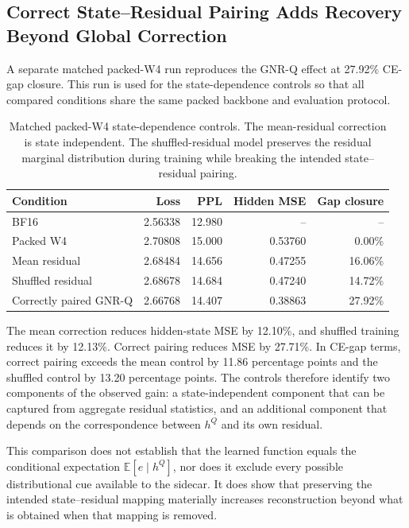 \documentclass[11pt]{article}
\begin{document}
\subsection{Correct State--Residual Pairing Adds Recovery Beyond Global Correction}

A separate matched packed-W4 run reproduces the GNR-Q effect at 27.92\% CE-gap closure. This run is used for the state-dependence controls so that all compared conditions share the same packed backbone and evaluation protocol.

\begin{table}[t]
\centering
\small
\begin{tabular}{lrrrr}
\toprule
Condition & Loss & PPL & Hidden MSE & Gap closure \\
\midrule
BF16 & 2.56338 & 12.980 & -- & -- \\
Packed W4 & 2.70808 & 15.000 & 0.53760 & 0.00\% \\
Mean residual & 2.68484 & 14.656 & 0.47255 & 16.06\% \\
Shuffled residual & 2.68678 & 14.684 & 0.47240 & 14.72\% \\
Correctly paired GNR-Q & 2.66768 & 14.407 & 0.38863 & 27.92\% \\
\bottomrule
\end{tabular}
\caption{Matched packed-W4 state-dependence controls. The mean-residual correction is state independent. The shuffled-residual model preserves the residual marginal distribution during training while breaking the intended state--residual pairing.}
\label{tab:statecontrols}
\end{table}

The mean correction reduces hidden-state MSE by 12.10\%, and shuffled training reduces it by 12.13\%. Correct pairing reduces MSE by 27.71\%. In CE-gap terms, correct pairing exceeds the mean control by 11.86 percentage points and the shuffled control by 13.20 percentage points. The controls therefore identify two components of the observed gain: a state-independent component that can be captured from aggregate residual statistics, and an additional component that depends on the correspondence between $h^Q$ and its own residual.

This comparison does not establish that the learned function equals the conditional expectation $\mathbb{E}[e\mid h^Q]$, nor does it exclude every possible distributional cue available to the sidecar. It does show that preserving the intended state--residual mapping materially increases reconstruction beyond what is obtained when that mapping is removed.
\end{document}
